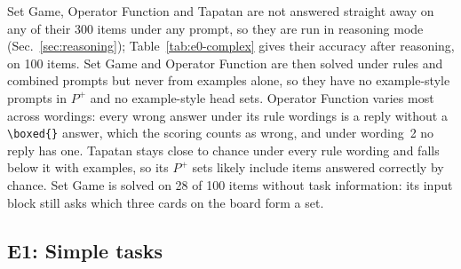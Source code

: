 \documentclass[11pt,a4paper]{article}
\begin{document}
Set Game, Operator Function and Tapatan are not answered straight away on any of their 300 items under any prompt, so they are run in reasoning mode (Sec.~\ref{sec:reasoning}); Table~\ref{tab:e0-complex} gives their accuracy after reasoning, on 100 items. Set Game and Operator Function are then solved under rules and combined prompts but never from examples alone, so they have no example-style prompts in $P^{+}$ and no example-style head sets. Operator Function varies most across wordings: every wrong answer under its rule wordings is a reply without a \texttt{\textbackslash boxed\{\}} answer, which the scoring counts as wrong, and under wording~2 no reply has one. Tapatan stays close to chance under every rule wording and falls below it with examples, so its $P^{+}$ sets likely include items answered correctly by chance. Set Game is solved on 28 of 100 items without task information: its input block still asks which three cards on the board form a set.

\begin{table}[tbp]
\centering\footnotesize

\caption{E0, simple tasks: accuracy per prompt style. Rule: the six instruction templates of \citet{yang2026shared}, mean and range; example: by number of shots; zero-shot: the prompts without task information. Items: dataset size.}
\label{tab:e0-simple}
\end{table}

\begin{table}[tbp]
\centering\footnotesize\setlength{\tabcolsep}{3.5pt}

\caption{E0, complex tasks at the easy level: accuracy per prompt. Mode: direct, with the answer limits of \citet{fu2026rules}; reasoning, as in Sec.~\ref{sec:reasoning}, accuracy after reasoning. Rule: the original rules prompt (orig.) and the six added wordings (w1--6: mean, and range). No task info: the prompt without task information. Chance: share of the most frequent label for the tasks with a fixed label set, 0 for open answers.}
\label{tab:e0-complex}
\end{table}

\subsection{E1: Simple tasks}\label{sec:res-e1}
\end{document}
